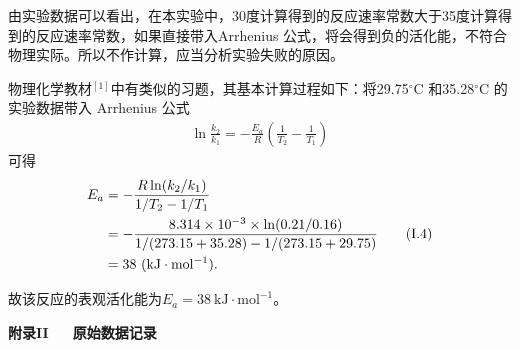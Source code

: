 \documentclass[12pt]{ctexart}
\numberwithin{equation}{section}
\begin{document}
由实验数据可以看出，在本实验中，30度计算得到的反应速率常数大于35度计算得到的反应速率常数，如果直接带入Arrhenius 公式，将会得到负的活化能，不符合物理实际。所以不作计算，应当分析实验失败的原因。

物理化学教材$^{[1]}$中有类似的习题，其基本计算过程如下：将29.75$^\circ$C 和35.28$^\circ$C 的实验数据带入 Arrhenius 公式
\begin{align}
    \ln\frac{k_2}{k_1} = -\frac{E_a}{R}
    \left(\frac{1}{T_2} - \frac{1}{T_1}\right)
    \tag{I.3}
\end{align}
可得
\begin{align}
    E_a
    &= -\frac{R\ln(k_2 / k_1)}{1/T_2 - 1/T_1} \notag\\
    &= -\frac{8.314 \times 10^{-3} \times \ln(0.21 / 0.16)}
        {1/(273.15+35.28) - 1/(273.15+29.75)} \tag{I.4} \\
    &= 38~\mathrm{(kJ\cdot mol^{-1})}. \notag
\end{align}

故该反应的表观活化能为$E_a = 38~\mathrm{kJ\cdot mol^{-1}}$。

\begin{center}
    \Large\bfseries{附录II~~~原始数据记录}
\end{center}
\end{document}
